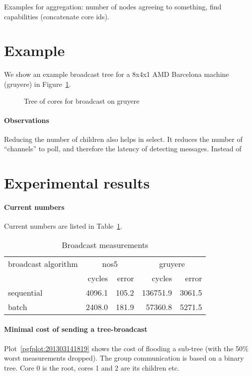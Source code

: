 \documentclass{article}
\begin{document}
Examples for aggregation: number of nodes agreeing to something, find
capabilities (concatenate core ids). 

\section{Example}

We show an example broadcast tree for a 8x4x1 AMD Barcelona machine
(gruyere) in Figure~\ref{fig:qrm_tree_gruyere}.

\begin{figure}
  
  \caption{Tree of cores for broadcast on gruyere}
  \label{fig:qrm_tree_gruyere}
\end{figure}

\paragraph{Observations} Reducing the number of children also helps in
select. It reduces the number of ``channels'' to poll, and therefore
the latency of detecting messages. Instead of

\section{Experimental results}

\paragraph{Current numbers} Current numbers are listed in
Table~\ref{tab:bc_measurements}. 

\begin{table}[htb]
  \centering
  \begin{tabular}{lrrrr}
    \toprule
    broadcast algorithm & \multicolumn{2}{c}{nos5} & \multicolumn{2}{c}{gruyere} \\
      & cycles & error & cycles & error \\
    \midrule
    sequential &  4096.1 &  105.2 & 136751.9 &   3061.5 \\
    batch      &  2408.0 &  181.9 &  57360.8 &   5271.5 \\
    \bottomrule
  \end{tabular}
  \caption{Broadcast measurements}
  \label{tab:bc_measurements}
\end{table}

\paragraph{Minimal cost of sending a tree-broadcast} %
Plot~\ref{pgfplot:201303141819} shows the cost of flooding a sub-tree
(with the 50\% worst measurements dropped). The group communication is
based on a binary tree. Core 0 is the root, cores 1 and 2 are its
children etc.
\end{document}
